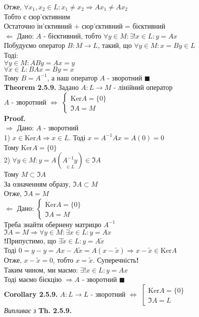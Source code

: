 \documentclass[a4paper, 14pt]{extarticle}
\def\th#1{\textbf{Theorem {#1}}}
\def\crl#1{\textbf{Corollary {#1}}}
\def\proof{\textbf{Proof.}\\}
\def\bigline{\vspace{5mm}\\}
\def\qed{$\blacksquare$}
\begin{document}
	Отже, $\forall x_1,x_2 \in L: x_1 \neq x_2 \Rightarrow Ax_1 \neq Ax_2$\\
	Тобто є сюр'єктивним\\
	Остаточно ін'єктивний + сюр'єктивний = бієктивний
	\bigline
	$\boxed{\Leftarrow}$ Дано: $A$ - бієктивний, тобто $\forall y \in M: \exists! x \in L: y=  Ax$\\
	Побудуємо оператор $B: M \to L$, такий, що $\forall y \in M: x = By \in L$\\
	Тоді:\\
	$\forall y \in M: ABy = Ax = y$\\
	$\forall x \in L: BAx = By = x$\\
	Тому $B = A^{-1}$, а наш оператор $A$ - зворотний \qed
	\bigline
	\th{2.5.9.} Задано $A: L \to M$ - лінійний оператор\\
	$A$ - зворотний $\iff$ $\begin{cases} \textrm{Ker} A = \{0\} \\ \Im A = M \end{cases}$\\
	\proof
	$\boxed{\Rightarrow}$ Дано: $A$ - зворотний\\
	1) $x \in \textrm{Ker} A \Rightarrow x \in L$. Тоді $x = A^{-1}Ax = A(0) = 0$\\
	Тому $\textrm{Ker} A = \{0\}$\\
	2) $\forall y \in M: y = A(\underset{\in L}{A^{-1}y}) \in \Im A$\\
	Тому $M \subset \Im A$\\
	За означенням образу, $\Im A \subset M$\\
	Отже, $\Im A = M$
	\bigline
	$\boxed{\Leftarrow}$ Дано: $\begin{cases} \textrm{Ker} A = \{0\} \\ \Im A = M \end{cases}$\\
	Треба знайти обернену матрицю $A^{-1}$\\
	$\Im A = M \Rightarrow \forall y \in M: \exists x \in L: y = Ax$\\
	\textbf{!}Припустимо, що $\exists \tilde{x} \in L: y = A\tilde{x}$\\
	Тоді $0 = y - y = Ax - A\tilde{x} = A(x-\tilde{x}) \Rightarrow x-\tilde{x} \in \textrm{Ker} A$\\
	Отже, $x-\tilde{x}=0$, тобто $x = \tilde{x}$. Суперечність\textbf{!}\\
	Таким чином, ми маємо: $\exists! x \in L: y = Ax$\\
	Тоді маємо бієкцію $\Rightarrow A$ - зворотний \qed
	\bigline
	\crl{2.5.9.} $A:L \to L$ - зворотний $\iff$ $\left[ \begin{gathered} \textrm{Ker} A = \{0\} \\ \Im A = L \end{gathered} \right.$\\
	\textit{Випливає з} \textbf{Th. 2.5.9.}\\
	
\end{document}

